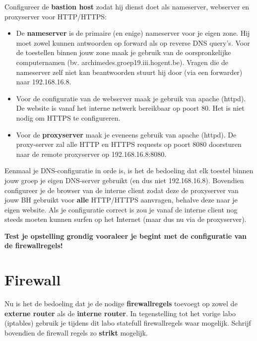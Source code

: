 \documentclass{report}
\begin{document}
Configureer de \textbf{bastion host} zodat hij dienst doet als nameserver, webserver en proxyserver voor HTTP/HTTPS:
\begin{itemize}
    \item De \textbf{nameserver} is de primaire (en enige) nameserver voor je eigen zone.
    Hij moet zowel kunnen antwoorden op forward als op reverse DNS query's.
    Voor de toestellen binnen jouw zone maak je gebruik van de oorspronkelijke computernamen (bv. archimedes.groep19.iii.hogent.be).
    Vragen die de nameserver zelf niet kan beantwoorden stuurt hij door (via een forwarder) naar 192.168.16.8.
    \item Voor de configuratie van de webserver maak je gebruik van apache (httpd).
    De website is vanaf het interne netwerk bereikbaar op poort 80.
    Het is niet nodig om HTTPS te configureren.
    \item Voor de \textbf{proxyserver} maak je eveneens gebruik van apache (httpd).
    De proxy-server zal alle HTTP en HTTPS requests op poort 8080 doorsturen naar de remote proxyserver op 192.168.16.8:8080.
\end{itemize}


Eenmaal je DNS-configuratie in orde is, is het de bedoeling dat elk toestel binnen jouw groep je eigen DNS-server gebruikt (en dus niet 192.168.16.8).
Bovendien configureer je de browser van de interne client zodat deze de proxyserver van jouw BH gebruikt voor \textbf{alle} HTTP/HTTPS aanvragen, behalve deze naar je eigen website.
Als je configuratie correct is zou je vanaf de interne client nog steeds moeten kunnen surfen op het Internet (maar dus nu via de proxyserver).

\textbf{Test je opstelling grondig vooraleer je begint met de configuratie van de firewallregels!}
\section{Firewall}

Nu is het de bedoeling dat je de nodige \textbf{firewallregels} toevoegt op zowel de \textbf{externe router} als de \textbf{interne router}.
In tegenstelling tot het vorige labo (iptables) gebruik je tijdens dit labo statefull firewallregels waar mogelijk.
Schrijf bovendien de firewall regels zo \textbf{strikt} mogelijk.
\end{document}

